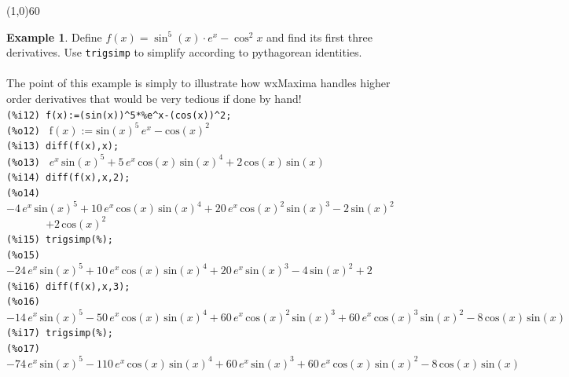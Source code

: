 \documentclass[10.5pt,twoside]{report}
\theoremstyle{definition}
\newtheorem{exmp}{Example}[section]
\begin{document}
\line(1,0){60}
\linethickness{0.5mm}

\begin{exmp}

Define $f(x)=\sin^5{(x)} \cdot e^x-\cos^2{x}$ and find its first three derivatives.  Use \verb|trigsimp| to simplify according to pythagorean identities.\\
${}$\\

The point of this example is simply to illustrate how wxMaxima handles higher order derivatives that would be very tedious if done by hand!\\

\verb|(%i12) f(x):=(sin(x))^5*%e^x-(cos(x))^2;|\\
\verb|(%o12) | $\mathrm{f}\left( x\right) :={\mathrm{sin}\left( x\right) }^{5}\,{e}^{x}-{\mathrm{cos}\left( x\right) }^{2}$\\
\verb|(%i13) diff(f(x),x);|\\
\verb|(%o13) | ${e}^{x}\,{\mathrm{sin}\left( x\right) }^{5}+5\,{e}^{x}\,\mathrm{cos}\left( x\right) \,{\mathrm{sin}\left( x\right) }^{4}+2\,\mathrm{cos}\left( x\right) \,\mathrm{sin}\left( x\right) $\\
\verb|(%i14) diff(f(x),x,2);|\\
\verb|(%o14) | $-4\,{e}^{x}\,{\mathrm{sin}\left( x\right) }^{5}+10\,{e}^{x}\,\mathrm{cos}\left( x\right) \,{\mathrm{sin}\left( x\right) }^{4}+20\,{e}^{x}\,{\mathrm{cos}\left( x\right) }^{2}\,{\mathrm{sin}\left( x\right) }^{3}-2\,{\mathrm{sin}\left( x\right) }^{2}$\\
\verb|       |$+2\,{\mathrm{cos}\left( x\right) }^{2}$\\
\verb|(%i15) trigsimp(%);|\\
\verb|(%o15) | $-24\,{e}^{x}\,{\mathrm{sin}\left( x\right) }^{5}+10\,{e}^{x}\,\mathrm{cos}\left( x\right) \,{\mathrm{sin}\left( x\right) }^{4}+20\,{e}^{x}\,{\mathrm{sin}\left( x\right) }^{3}-4\,{\mathrm{sin}\left( x\right) }^{2}+2$\\
\verb|(%i16) diff(f(x),x,3);|\\
\verb|(%o16) | $-14\,{e}^{x}\,{\mathrm{sin}\left( x\right) }^{5}-50\,{e}^{x}\,\mathrm{cos}\left( x\right) \,{\mathrm{sin}\left( x\right) }^{4}+60\,{e}^{x}\,{\mathrm{cos}\left( x\right) }^{2}\,{\mathrm{sin}\left( x\right) }^{3}+60\,{e}^{x}\,{\mathrm{cos}\left( x\right) }^{3}\,{\mathrm{sin}\left( x\right) }^{2}-8\,\mathrm{cos}\left( x\right) \,\mathrm{sin}\left( x\right) $\\
\verb|(%i17) trigsimp(%);|\\
\verb|(%o17) | $-74\,{e}^{x}\,{\mathrm{sin}\left( x\right) }^{5}-110\,{e}^{x}\,\mathrm{cos}\left( x\right) \,{\mathrm{sin}\left( x\right) }^{4}+60\,{e}^{x}\,{\mathrm{sin}\left( x\right) }^{3}+60\,{e}^{x}\,\mathrm{cos}\left( x\right) \,{\mathrm{sin}\left( x\right) }^{2}-8\,\mathrm{cos}\left( x\right) \,\mathrm{sin}\left( x\right) $

\end{exmp}
\end{document}
